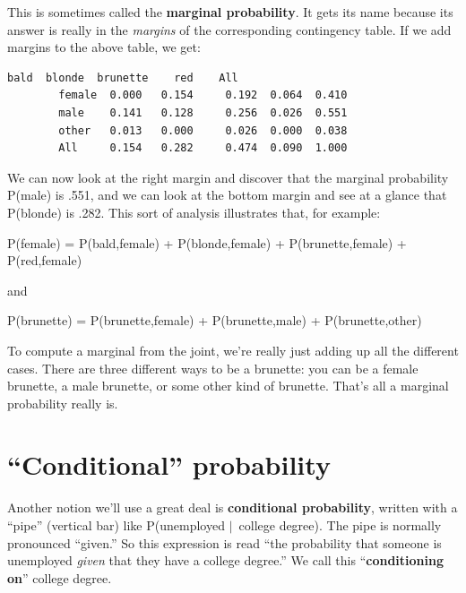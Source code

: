 This is sometimes called the \textbf{marginal probability}. It gets its name
because its answer is really in the \textit{margins} of the corresponding
contingency table. If we add margins to the above table, we get:

\begin{Verbatim}[fontsize=\small,samepage=true,frame=leftline,framesep=5mm,framerule=1mm]
                 bald  blonde  brunette    red    All
        female  0.000   0.154     0.192  0.064  0.410
        male    0.141   0.128     0.256  0.026  0.551
        other   0.013   0.000     0.026  0.000  0.038
        All     0.154   0.282     0.474  0.090  1.000
\end{Verbatim}

We can now look at the right margin and discover that the marginal probability
P(male) is .551, and we can look at the bottom margin and see at a glance that
P(blonde) is .282. This sort of analysis illustrates that, for example:

\begin{center}
\small
P(female) = P(bald,female) + P(blonde,female) + P(brunette,female) + P(red,female)
\end{center}

and

\begin{center}
\small
P(brunette) = P(brunette,female) + P(brunette,male) + P(brunette,other)
\end{center}

To compute a marginal from the joint, we're really just adding up all the
different cases. There are three different ways to be a brunette: you can be a
female brunette, a male brunette, or some other kind of brunette. That's all a
marginal probability really is.

\section{``Conditional'' probability}


Another notion we'll use a great deal is \textbf{conditional probability},
written with a ``pipe'' (vertical bar) like P(unemployed $|$\ college degree).
The pipe is normally pronounced ``given.'' So this expression is read ``the
probability that someone is unemployed \textit{given} that they have a college
degree.'' We call this ``\textbf{conditioning on}'' college degree.

